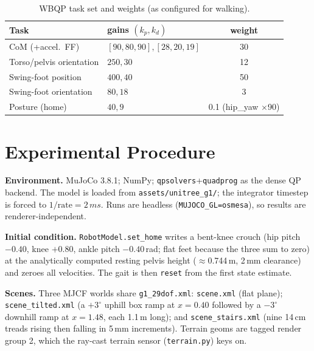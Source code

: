 \documentclass[10pt,a4paper]{article}
\providecommand{\toprule}{\hline\hline}
\providecommand{\midrule}{\hline}
\providecommand{\bottomrule}{\hline\hline}
\newcommand{\SI}[2]{#1\,#2}          %
\newcommand{\code}[1]{\texttt{\small #1}}
\begin{document}
\begin{table}[h]
\centering\small
\caption{WBQP task set and weights (as configured for walking).}
\label{tab:tasks}
\begin{tabular}{llc}
\toprule
Task & gains $(k_p,k_d)$ & weight\\
\midrule
CoM (+accel.\ FF) & $[90,80,90],[28,20,19]$ & 30 \\
Torso/pelvis orientation & $250,30$ & 12 \\
Swing-foot position & $400,40$ & 50 \\
Swing-foot orientation & $80,18$ & 3 \\
Posture (home) & $40,9$ & 0.1 (hip\_yaw $\times$90) \\
\bottomrule
\end{tabular}
\end{table}

\section{Experimental Procedure}
\textbf{Environment.} MuJoCo 3.8.1; NumPy; \code{qpsolvers}+\code{quadprog} as the
dense QP backend. The model is loaded from \code{assets/unitree\_g1/}; the
integrator timestep is forced to $1/\text{rate}=\SI{2}{ms}$. Runs are headless
(\code{MUJOCO\_GL=osmesa}), so results are renderer-independent.

\textbf{Initial condition.} \code{RobotModel.set\_home} writes a bent-knee crouch
(hip pitch $-0.40$, knee $+0.80$, ankle pitch $-0.40$\,rad; flat feet because the
three sum to zero) at the analytically computed resting pelvis height
($\approx$\SI{0.744}{m}, \SI{2}{mm} clearance) and zeroes all velocities. The
gait is then \code{reset} from the first state estimate.

\textbf{Scenes.} Three MJCF worlds share \code{g1\_29dof.xml}: \code{scene.xml}
(flat plane); \code{scene\_tilted.xml} (a $+3^\circ$ uphill box ramp at $x{=}0.40$
followed by a $-3^\circ$ downhill ramp at $x{=}1.48$, each \SI{1.1}{m} long); and
\code{scene\_stairs.xml} (nine \SI{14}{cm} treads rising then falling in
\SI{5}{mm} increments). Terrain geoms are tagged render group 2, which the
ray-cast terrain sensor (\code{terrain.py}) keys on.
\end{document}
